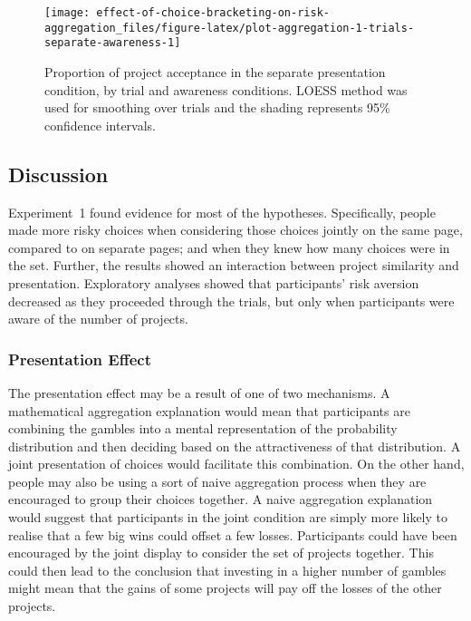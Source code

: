 \documentclass[
  english,
  man, donotrepeattitle,floatsintext]{apa7}
\theoremstyle{definition}
\theoremstyle{definition}
\theoremstyle{definition}
\theoremstyle{definition}
\theoremstyle{remark}
\begin{document}
\begin{figure}
\texttt{[image: effect-of-choice-bracketing-on-risk-aggregation\_files/figure-latex/plot-aggregation-1-trials-separate-awareness-1]} \caption{Proportion of project acceptance in the separate presentation condition, by trial and awareness conditions. LOESS method was used for smoothing over trials and the shading represents 95\% confidence intervals.}\label{fig:plot-aggregation-1-trials-separate-awareness}
\end{figure}

\hypertarget{discussion-aggregation-1}{%
\subsection{Discussion}\label{discussion-aggregation-1}}

Experiment~1 found evidence for most of the hypotheses. Specifically, people
made more risky choices when considering those choices jointly on the same page,
compared to on separate pages; and when they knew how many choices were in the
set. Further, the results showed an interaction between project similarity and
presentation. Exploratory analyses showed that participants' risk aversion
decreased as they proceeded through the trials, but only when participants were
aware of the number of projects.

\hypertarget{presentation-effect}{%
\subsubsection{Presentation Effect}\label{presentation-effect}}

The presentation effect may be a result of one of two mechanisms. A mathematical
aggregation explanation would mean that participants are combining the gambles
into a mental representation of the probability distribution and then deciding
based on the attractiveness of that distribution. A joint presentation of
choices would facilitate this combination. On the other hand, people may also be
using a sort of naive aggregation process when they are encouraged to group
their choices together. A naive aggregation explanation would suggest that
participants in the joint condition are simply more likely to realise that a few
big wins could offset a few losses. Participants could have been encouraged by
the joint display to consider the set of projects together. This could then lead
to the conclusion that investing in a higher number of gambles might mean that
the gains of some projects will pay off the losses of the other projects.
\end{document}
